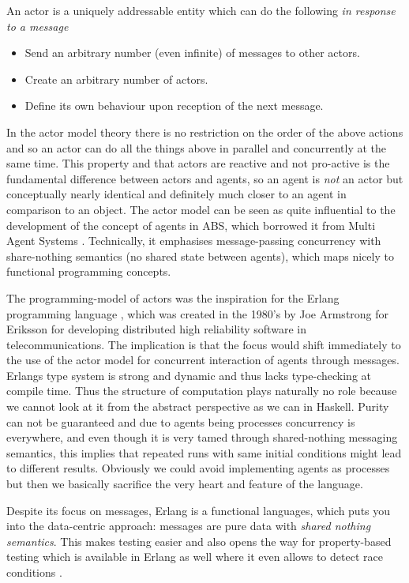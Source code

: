 An actor is a uniquely addressable entity which can do the following \textit{in response to a message}
\begin{itemize}
	\item Send an arbitrary number (even infinite) of messages to other actors.
	\item Create an arbitrary number of actors.
	\item Define its own behaviour upon reception of the next message.
\end{itemize}

In the actor model theory there is no restriction on the order of the above actions and so an actor can do all the things above in parallel and concurrently at the same time. This property and that actors are reactive and not pro-active is the fundamental difference between actors and agents, so an agent is \textit{not} an actor but conceptually nearly identical and definitely much closer to an agent in comparison to an object. The actor model can be seen as quite influential to the development of the concept of agents in ABS, which borrowed it from Multi Agent Systems \cite{wooldridge_introduction_2009}. Technically, it emphasises message-passing concurrency with share-nothing semantics (no shared state between agents), which maps nicely to functional programming concepts.

The programming-model of actors \cite{agha_actors:_1986} was the inspiration for the Erlang programming language \cite{armstrong_erlang_2010}, which was created in the 1980's by Joe Armstrong for Eriksson for developing distributed high reliability software in telecommunications. The implication is that the focus would shift immediately to the use of the actor model for concurrent interaction of agents through messages. Erlangs type system is strong and dynamic and thus lacks type-checking at compile time. Thus the structure of computation plays naturally no role because we cannot look at it from the abstract perspective as we can in Haskell. Purity can not be guaranteed and due to agents being processes concurrency is everywhere, and even though it is very tamed through shared-nothing messaging semantics, this implies that repeated runs with same initial conditions might lead to different results. Obviously we could avoid implementing agents as processes but then we basically sacrifice the very heart and feature of the language.

Despite its focus on messages, Erlang is a functional languages, which puts you into the data-centric approach: messages are pure data with \textit{shared nothing semantics}. This makes testing easier and also opens the way for property-based testing which is available in Erlang as well where it even allows to detect race conditions \cite{claessen_finding_2009}. 

